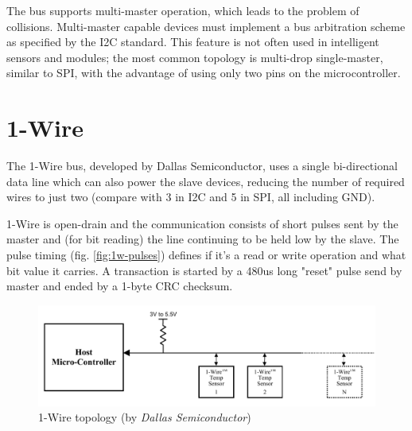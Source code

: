 The bus supports multi-master operation, which leads to the problem of collisions. Multi-master capable devices must implement a bus arbitration scheme as specified by the I2C standard. This feature is not often used in intelligent sensors and modules; the most common topology is multi-drop single-master, similar to SPI, with the advantage of using only two pins on the microcontroller.

\section{1-Wire}

The 1-Wire bus, developed by Dallas Semiconductor, uses a single bi-directional data line which can also power the slave devices, reducing the number of required wires to just two (compare with 3 in I2C and 5 in SPI, all including GND). 

1-Wire is open-drain and the communication consists of short pulses sent by the master and (for bit reading) the line continuing to be held low by the slave. The pulse timing (fig. \ref{fig:1w-pulses}) defines if it's a read or write operation and what bit value it carries. A transaction is started by a 480us long "reset" pulse send by master and ended by a 1-byte CRC checksum.

\begin{figure}
	\centering
	\includegraphics[width=.9\textwidth] {img/1w-topology.png}
	\caption{\label{fig:1w-topology}1-Wire topology (by \textit{Dallas Semiconductor})}
\end{figure}

